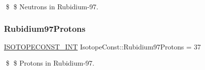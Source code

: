 \$ \$ Neutrons in Rubidium-\/97. \mbox{\label{group___isotope_const-_rubidium-_rb97_ga19179195b926dfec0ca12e27c35bd386}} 
\subsubsection{\texorpdfstring{Rubidium97\+Protons}{Rubidium97Protons}}
{\footnotesize\ttfamily \mbox{\hyperlink{group___isotope_const-_macros_ga5f18360b3e99483a35c32d789e62621c}{I\+S\+O\+T\+O\+P\+E\+C\+O\+N\+S\+T\+\_\+\+I\+NT}} Isotope\+Const\+::\+Rubidium97\+Protons = 37}

\$ \$ Protons in Rubidium-\/97. 